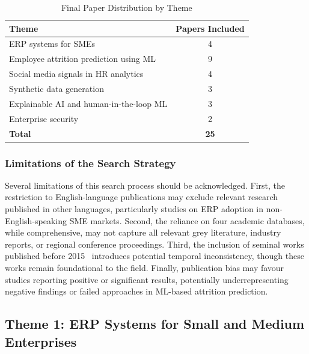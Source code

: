 \documentclass[12pt,a4paper]{article}
\begin{document}
\begin{table}[htbp]
\centering
\caption{Final Paper Distribution by Theme}
\label{tab:paper-distribution}
\begin{tabular}{lc}
\toprule
\textbf{Theme} & \textbf{Papers Included} \\
\midrule
ERP systems for SMEs                      & 4  \\
Employee attrition prediction using ML    & 9  \\
Social media signals in HR analytics      & 4  \\
Synthetic data generation                 & 3  \\
Explainable AI and human-in-the-loop ML   & 3  \\
Enterprise security                       & 2  \\
\midrule
\textbf{Total}                            & \textbf{25} \\
\bottomrule
\end{tabular}
\end{table}

\subsubsection{Limitations of the Search Strategy}
\label{sec:search-limitations}

Several limitations of this search process should be acknowledged. First, the restriction to English-language publications may exclude relevant research published in other languages, particularly studies on ERP adoption in non-English-speaking SME markets. Second, the reliance on four academic databases, while comprehensive, may not capture all relevant grey literature, industry reports, or regional conference proceedings. Third, the inclusion of seminal works published before 2015~\cite{davenport1998erp, ferraiolo2007rbac} introduces potential temporal inconsistency, though these works remain foundational to the field. Finally, publication bias may favour studies reporting positive or significant results, potentially underrepresenting negative findings or failed approaches in ML-based attrition prediction.

\subsection{Theme 1: ERP Systems for Small and Medium Enterprises}
\label{sec:theme1}
\end{document}
